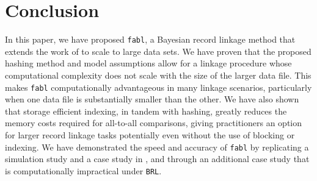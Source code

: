 \documentclass[ba]{imsart}
\begin{document}
	
	\section{Conclusion}
	\label{discussion}
	
	In this paper, we have proposed \texttt{fabl}, a Bayesian record linkage method that extends the work of \cite{sadinle_bayesian_2017} to scale to large data sets. We have proven that the proposed hashing method and model assumptions allow for a linkage procedure whose computational complexity does not scale with the size of the larger data file. This makes \texttt{fabl} computationally advantageous in many linkage scenarios, particularly when one data file is substantially smaller than the other. We have also shown that storage efficient indexing, in tandem with hashing, greatly reduces the memory costs required for all-to-all comparisons, giving practitioners an option for larger record linkage tasks potentially even without the use of blocking or indexing. We have demonstrated the speed and accuracy of \texttt{fabl} by replicating a simulation study and a case study in \cite{sadinle_bayesian_2017}, and through an additional case study that is computationally impractical under \texttt{BRL}. 
	
\end{document}

